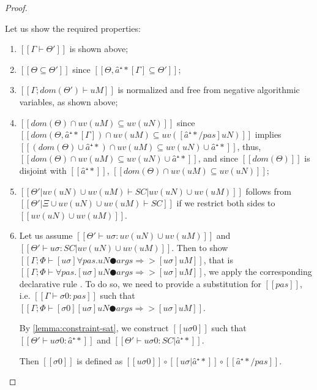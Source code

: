 \begin{proof}
\begin{caseof}
            Let us show the required properties:
            \begin{enumerate}
                \item $[[Γ ⊢ Θ']]$ is shown above;
                \item $[[Θ ⊆ Θ']]$ since $[[Θ, â⁺*[Γ] ⊆ Θ']]$;
                \item $[[Γ; dom(Θ') ⊢  uM]]$ is normalized and free from negative algorithmic variables, as shown above;
                \item $[[dom(Θ) ∩ uv(uM) ⊆ uv(uN)]]$
                    since 
                    $[[dom(Θ, â⁺*[Γ]) ∩ uv(uM) ⊆ uv([â⁺*/pas]uN)]]$
                    implies 
                    $[[(dom(Θ) ∪ {â⁺*}) ∩ uv(uM) ⊆ uv(uN) ∪ {â⁺*}]]$,
                    thus,
                    $[[dom(Θ) ∩ uv(uM) ⊆ uv(uN) ∪ {â⁺*}]]$,
                    and since $[[dom(Θ)]]$ is disjoint with $[[{â⁺*}]]$,
                    $[[dom(Θ) ∩ uv(uM) ⊆ uv(uN)]]$;

                \item $[[Θ'|uv(uN) ∪ uv(uM) ⊢ SC | uv(uN) ∪ uv(uM)]]$ follows from 
                    $[[Θ'|Ξ ∪ uv(uN) ∪ uv(uM) ⊢ SC]]$ if we restrict both sides to 
                    $[[uv(uN) ∪ uv(uM)]]$.
                \item Let us assume $[[ Θ' ⊢ uσ : uv(uN) ∪ uv(uM) ]]$ and
                    $[[ Θ' ⊢ uσ : SC | uv(uN) ∪ uv(uM) ]]$.
                    Then to show $[[ Γ ; Φ ⊢ [uσ]∀pas.uN ● args ⇒> [uσ]uM ]]$,
                    that is $[[ Γ ; Φ ⊢ ∀pas.[uσ]uN ● args ⇒> [uσ]uM ]]$,
                    we apply the corresponding declarative rule .
                    To do so, we need to provide a substitution for $[[pas]]$, 
                    i.e. $[[Γ ⊢ σ0 : {pas}]]$ such that
                    $[[Γ; Φ ⊢ [σ0][uσ]uN ● args ⇒> [uσ]uM ]]$.

                    By \cref{lemma:constraint-sat},
                    we construct $[[uσ0]]$ such that
                    $[[Θ' ⊢ uσ0 : {â⁺*}]]$
                    and 
                    $[[Θ' ⊢ uσ0 : SC|{â⁺*}]]$.

                    Then $[[σ0]]$ is defined as 
                    $[[uσ0]] \circ [[uσ|{â⁺*}]] \circ [[â⁺*/pas]]$. 


\end{enumerate}
\end{caseof}
\end{proof}
